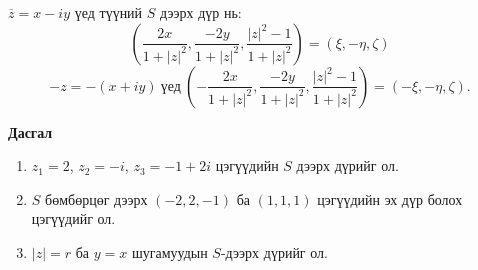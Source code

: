 \begin{sol}
$\overline{z}=x-iy$ үед түүний $S$ дээрх дүр нь:
$$\left(\frac{2x}{1+|z|^2}, \frac{-2y}{1+|z|^2}, \frac{|z|^2-1}{1+|z|^2}\right)=(\xi, -\eta, \zeta)$$
$$-z=-(x+iy) \ \text{үед} \ \left(-\frac{2x}{1+|z|^2}, \frac{-2y}{1+|z|^2}, \frac{|z|^2-1}{1+|z|^2}\right)=(-\xi, -\eta, \zeta).$$
\end{sol}
\begin{center}
   \textbf{ Дасгал}
\end{center}
\begin{enumerate}
    \item [7.] $z_1=2$, $z_2=-i$, $z_3=-1+2i$ цэгүүдийн $S$ дээрх дүрийг ол.
    \item [8.] $S$ бөмбөрцөг дээрх $(-2,2,-1)$ ба $(1,1,1)$ цэгүүдийн эх дүр болох цэгүүдийг ол.
    \item [9.] $|z|=r$ ба $y=x$ шугамуудын $S$-дээрх дүрийг ол.
\end{enumerate}

